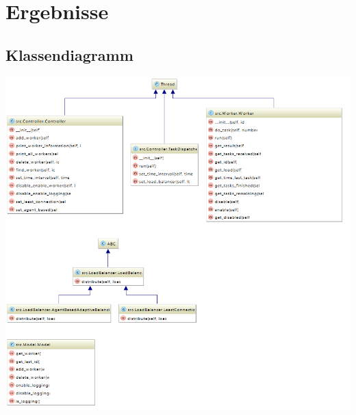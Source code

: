 
\section{Ergebnisse}
\label{sec:Ergebnisse}



\subsection{Klassendiagramm}

\begin{minipage}{\linewidth}
	\centering
	\includegraphics[width=1\linewidth]{images/class_diagram}
\end{minipage}


